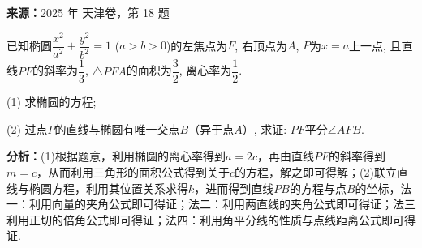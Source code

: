 \begin{question}[points=15]
\textbf{来源：}2025 年 天津卷，第 18 题\par
已知椭圆$\dfrac{x^2}{a^2} + \dfrac{y^2}{b^2} = 1$ ($a > b > 0$)的左焦点为$F$, 右顶点为$A$, $P$为$x = a$上一点, 且直线$PF$的斜率为$\dfrac{1}{3}$, $\triangle PFA$的面积为$\dfrac{3}{2}$, 离心率为$\dfrac{1}{2}$.

(1) 求椭圆的方程;

(2) 过点$P$的直线与椭圆有唯一交点$B$（异于点$A$）, 求证: $PF$平分$\angle AFB$.
\begin{solution}

\textbf{分析：}(1)根据题意，利用椭圆的离心率得到$a=2c$，再由直线$PF$的斜率得到$m=c$，从而利用三角形的面积公式得到关于$c$的方程，解之即可得解；(2)联立直线与椭圆方程，利用其位置关系求得$k$，进而得到直线$PB$的方程与点$B$的坐标，法一：利用向量的夹角公式即可得证；法二：利用两直线的夹角公式即可得证；法三利用正切的倍角公式即可得证；法四：利用角平分线的性质与点线距离公式即可得证.


\end{solution}
\end{question}
